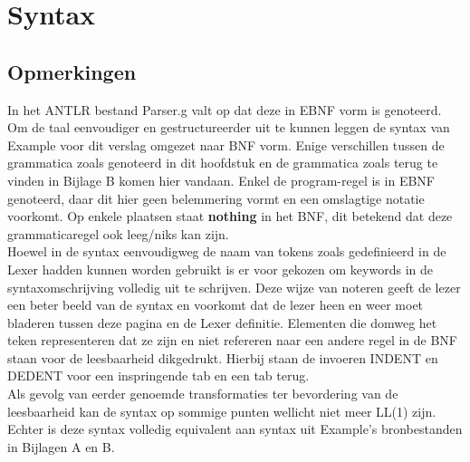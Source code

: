 \chapter{Syntax}
\section{Opmerkingen}
In het ANTLR bestand Parser.g valt op dat deze in EBNF vorm is genoteerd. Om de taal eenvoudiger en gestructureerder uit te kunnen leggen de syntax van Example voor dit verslag omgezet naar BNF vorm. Enige verschillen tussen de grammatica zoals genoteerd in dit hoofdstuk en de grammatica zoals terug te vinden in Bijlage B komen hier vandaan. Enkel de program-regel is in EBNF genoteerd, daar dit hier geen belemmering vormt en een omslagtige notatie voorkomt. Op enkele plaatsen staat \textbf{nothing} in het BNF, dit betekend dat deze grammaticaregel ook leeg/niks kan zijn.\\
 
Hoewel in de syntax eenvoudigweg de naam van tokens zoals gedefinieerd in de Lexer hadden kunnen worden gebruikt is er voor gekozen om keywords in de syntaxomschrijving volledig uit te schrijven. Deze wijze van noteren geeft de lezer een beter beeld van de syntax en voorkomt dat de lezer heen en weer moet bladeren tussen deze pagina en de Lexer definitie. Elementen die domweg het teken representeren dat ze zijn en niet refereren naar een andere regel in de BNF staan voor de leesbaarheid dikgedrukt. Hierbij staan de invoeren INDENT en DEDENT voor een inspringende tab en een tab terug.\\

Als gevolg van eerder genoemde transformaties ter bevordering van de leesbaarheid kan de syntax op sommige punten wellicht niet meer LL(1) zijn. Echter is deze syntax volledig equivalent aan syntax uit Example's bronbestanden in Bijlagen A en B.

